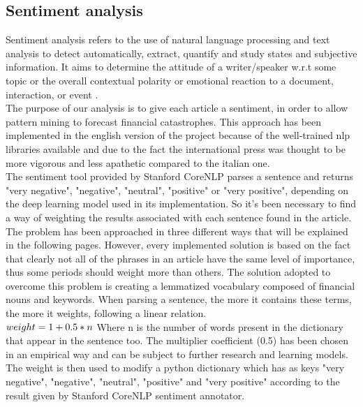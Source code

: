 \subsection{Sentiment analysis}
Sentiment analysis refers to the use of natural language processing and text analysis to detect automatically, extract, quantify and study states and subjective information. It aims to determine the attitude of a writer/speaker w.r.t some topic or the overall contextual polarity or emotional reaction to a document, interaction, or event \cite{sentimentwiki}. \\
The purpose of our analysis is to give each article a sentiment, in order to allow pattern mining to forecast financial catastrophes. This approach has been implemented in the english version of the project because of the well-trained nlp libraries available and due to the fact the international press was thought to be more vigorous and less apathetic compared to the italian one. \\
The sentiment tool provided by Stanford CoreNLP parses a sentence and returns "very negative", "negative", "neutral", "positive" or "very positive", depending on the deep learning model \cite{sentimentdeep} used in its implementation. So it's been necessary to find a way of weighting the results associated with each sentence found in the article. \\
The problem has been approached in three different ways that will be explained in the following pages.
However, every implemented solution is based on the fact that clearly not all of the phrases in an article have the same level of importance, thus some periods should weight more than others. The solution adopted to overcome this problem is creating a lemmatized vocabulary composed of financial nouns and keywords. When parsing a sentence, the more it contains these terms, the more it weights, following a linear relation. \\
\begin{math}
weight = 1 + 0.5*n \\
\end{math}
Where n is the number of words present in the dictionary that appear in the sentence too.
The multiplier coefficient (0.5) has been chosen in an empirical way and can be subject to further research and learning models. \\
The weight is then used to modify a python dictionary which has as keys "very negative", "negative", "neutral", "positive" and "very positive" according to the result given by Stanford CoreNLP sentiment annotator. 

